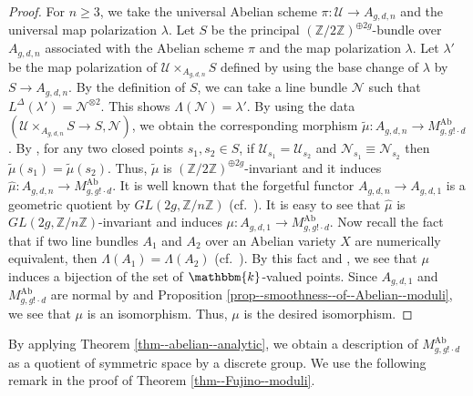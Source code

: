 \documentclass[12pt,twoside]{amsart}
\theoremstyle{definition}
\begin{document}
\begin{proof}
For $n\ge3$, we take the universal Abelian scheme $\pi\colon \mathcal{U}\to A_{g,d,n}$ and the universal map polarization $\lambda$.
Let $S$ be the principal $(\mathbb{Z}/2\mathbb{Z})^{\oplus 2g}$-bundle over $A_{g,d,n}$ associated with the Abelian scheme $\pi$ and the map polarization $\lambda$.
Let $\lambda'$ be the map polarization of $\mathcal{U}\times_{A_{g,d,n}}S$ defined by using the base change of $\lambda$ by $S\to A_{g,d,n}$.
By the definition of $S$, we can take a line bundle $\mathcal{N}$ such that $L^\Delta(\lambda')=\mathcal{N}^{\otimes 2}$.
This shows $\Lambda(\mathcal{N})=\lambda'$.
By using the data $(\mathcal{U}\times_{A_{g,d,n}}S\to S, \mathcal{N})$, we obtain the corresponding morphism $\tilde{\mu}\colon A_{g,d,n}\to M^{\mathrm{Ab}}_{g,g!\cdot d}$.
By \cite[Lemma 6.2]{Hat23}, for any two closed points $s_1,s_2\in S$, if $\mathcal{U}_{s_1}=\mathcal{U}_{s_2}$ and $\mathcal{N}_{s_1}\equiv \mathcal{N}_{s_2}$ then $\tilde{\mu}(s_1)=\tilde{\mu}(s_2)$.
Thus, $\tilde{\mu}$ is $(\mathbb{Z}/2\mathbb{Z})^{\oplus 2g}$-invariant and it induces $\hat{\mu}\colon A_{g,d,n}\to M^{\mathrm{Ab}}_{g,g!\cdot d}$.
It is well known that the forgetful functor $A_{g,d,n}\to A_{g,d,1}$ is a geometric quotient by $GL(2g,\mathbb{Z}/n\mathbb{Z})$ (cf.~\cite[Lemmas 7.11 and 7.12]{GIT}).
It is easy to see that $\hat{\mu}$ is $GL(2g,\mathbb{Z}/n\mathbb{Z})$-invariant and induces $\mu\colon A_{g,d,1}\to M^{\mathrm{Ab}}_{g,g!\cdot d}$. 
Now recall the fact that if two line bundles $A_1$ and $A_2$ over an Abelian variety $X$ are numerically equivalent, then $\Lambda(A_1)=\Lambda(A_2)$ (cf.~\cite[Section 6.2]{GIT}). 
By this fact and \cite[Lemma 6.2]{Hat23}, we see that $\mu$ induces a bijection of the set of $\mathbbm{k}$-valued points.
Since $A_{g,d,1}$ and $M^{\mathrm{Ab}}_{g,g!\cdot d}$ are normal by \cite[Propositions 2.2.3.7 and 2.2.4.4]{Lan} and Proposition \ref{prop--smoothness--of--Abelian--moduli}, we see that $\mu$ is an isomorphism.
Thus, $\mu$ is the desired isomorphism.
\end{proof}
By applying Theorem \ref{thm--abelian--analytic}, we obtain a description of $M^{\mathrm{Ab}}_{g,g!\cdot d}$ as a quotient of symmetric space by a discrete group.
We use the following remark in the proof of Theorem \ref{thm--Fujino--moduli}.
\end{document}
